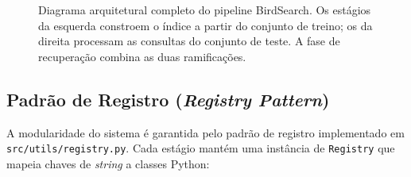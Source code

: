 \documentclass[12pt,a4paper]{article}
\begin{document}
\begin{figure}[htbp]
\caption{Diagrama arquitetural completo do pipeline BirdSearch. Os estágios
da esquerda constroem o índice a partir do conjunto de treino; os da direita
processam as consultas do conjunto de teste. A fase de recuperação combina as
duas ramificações.}
\label{fig:pipeline}
\end{figure}

\subsection{Padrão de Registro (\emph{Registry Pattern})}

A modularidade do sistema é garantida pelo padrão de registro implementado em
\texttt{src/utils/registry.py}. Cada estágio mantém uma instância de
\texttt{Registry} que mapeia chaves de \emph{string} a classes Python:
\end{document}
